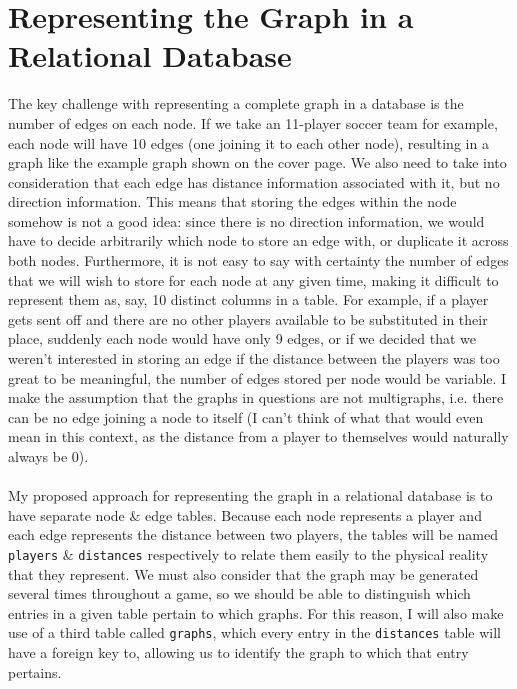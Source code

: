 \documentclass[a4paper,11pt]{article}
\begin{document}

\newpage
\tableofcontents
\newpage
\setcounter{page}{1}

\section{Representing the Graph in a Relational Database}


The key challenge with representing a complete graph in a database is the number of edges on each node. 
If we take an 11-player soccer team for example, each node will have 10 edges (one joining it to each other node), resulting in a graph like the example 
graph shown on the cover page.
We also need to take into consideration that each edge has distance information associated with it, but no direction 
information.
This means that storing the edges within the node somehow is not a good idea:
since there is no direction information, we would have to decide arbitrarily which node to store an edge with, or duplicate it across both nodes. 
Furthermore, it is not easy to say with certainty the number of edges that we will wish to store for each node at any given time, making it difficult to represent them as, say, 10 distinct columns in a 
table. 
For example, if a player gets sent off and there are no other players available to be substituted in their place, suddenly each node would have only 9 edges, or if we decided that we weren't interested in
storing an edge if the distance between the players was too great to be meaningful, the number of edges stored per node would be variable.
I make the assumption that the graphs in questions are not multigraphs, i.e. there can be no edge joining a node to itself (I can't think of what that would even 
mean in this context, as the distance from a player to themselves would naturally always be 0).
\\\\
My proposed approach for representing the graph in a relational database is to have separate node \& edge tables.
Because each node represents a player and each edge represents the distance between two players, the tables will be named 
\texttt{players} \& \texttt{distances} respectively to relate them easily to the physical reality that they represent.
We must also consider that the graph may be generated several times throughout a game, so we should be able to distinguish which entries in a given table pertain to which graphs. 
For this reason, I will also make use of a third table called \texttt{graphs}, which every entry in the \texttt{distances} table will have a foreign key to, allowing us to identify the
graph to which that entry pertains. 
\end{document}
